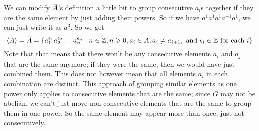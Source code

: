 \documentclass[12pt]{article}
\begin{document}
    We can modify $\,\overline{\!{A}}$'s
    definition a little bit to group consecutive
    $a_i$s together if they are the same element
    by just adding their powers.
    So if we have $a^1a^1a^1a^{-1}a^1$,
    we can just write it as $a^3$.
    So we get
    \[ \left\langle A \right\rangle = \,\overline{\!{A}} 
    = \{ a_1^{\epsilon_1}a_2^{\epsilon_2} \dots a_n^{\epsilon_n} \mid
    n \in \mathbb{Z}, n \geqslant 0, a_i \in A,
    a_i \neq a_{i+1},
    \text{ and } \epsilon_i \in \mathbb{Z} \text { for each } i \} \]
    Note that that means that there won't
    be any consecutive elements $a_i$ and $a_j$
    that are the same anymore;
    if they were the same,
    then we would have just combined them.
    This does not however mean that all elements $a_i$
    in each combination are distinct.
    This approach of grouping similar elements as one power
    only applies to consecutive elements that are the same;
    since $G$ may not be abelian,
    we can't just move non-consecutive
    elements that are the same to group them in one power.
    So the same element may appear more than once,
    just not consecutively. \\
\end{document}
